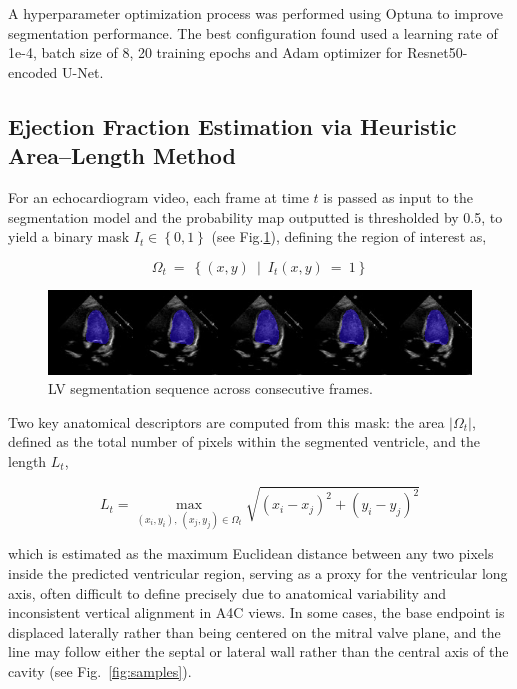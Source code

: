 \documentclass[runningheads]{llncs}
\begin{document}
A hyperparameter optimization process was performed using Optuna\cite{akiba2019optuna} to improve segmentation performance. The best configuration found used a learning rate of 1e-4, batch size of 8, 20 training epochs and Adam optimizer for Resnet50-encoded U-Net.

\subsection{Ejection Fraction Estimation via Heuristic Area–Length Method}

For an echocardiogram video, each frame at time $t$ is passed as input to the segmentation model and the probability map outputted is thresholded by 0.5, to yield a binary mask $I_t \in \left\{0, 1\right\}$ (see Fig.\ref{fig:seg-sequence}), defining the region of interest as, 

\begin{equation}
\Omega_t\ =\ \left\{(x,y)\ \middle|{\ I}_t(x,y)\ =\ 1\right\}
\end{equation}

\begin{figure}
    \centering
    \includegraphics[width=0.9\linewidth]{segmentation_sequence.png}
    \caption{LV segmentation sequence across consecutive frames.}
    \label{fig:seg-sequence}
\end{figure}

Two key anatomical descriptors are computed from this mask: the area $\left|\Omega_t\right|$, defined as the total number of pixels within the segmented ventricle, and the length $L_t$,


\begin{equation}
L_t = \max_{(x_i, y_i),\, (x_j, y_j) \in \Omega_t} \sqrt{(x_i - x_j)^2 + (y_i - y_j)^2}
\end{equation}

\noindent
which is estimated as the maximum Euclidean distance between any two pixels inside the predicted ventricular region, serving as a proxy for the ventricular long axis, often difficult to define precisely due to anatomical variability and inconsistent vertical alignment in A4C views. In some cases, the base endpoint is displaced laterally rather than being centered on the mitral valve plane, and the line may follow either the septal or lateral wall rather than the central axis of the cavity (see Fig.~\ref{fig:samples}).
\end{document}
